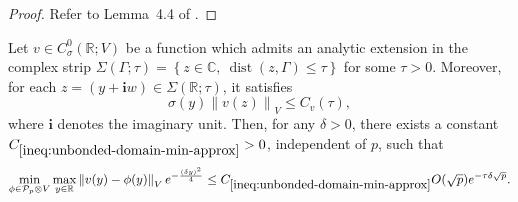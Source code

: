 \documentclass[final,onefignum,onetabnum]{mousaviart}
\begin{document}
			\vspace*{1mm}
			\begin{proof}
				Refer to Lemma~4.4 of \cite{Babuska-Nobile-Tempone}.
			\end{proof}
			
			\vspace*{1mm}
			\begin{lemma}
				\label{lem:unbonded-domain-min-approx}
				Let $v \in C^0_\sigma (\mathbb{R}; V)$ be a function which admits an analytic extension in the complex strip  $\Sigma \left( \Gamma; \tau \right) = \left\lbrace z \in \mathbb{C},~ \operatorname{dist}(z, \Gamma) \leq \tau \right\rbrace $ for some $\tau>0$. Moreover, for each $z = (y + \boldsymbol{i} w) \in \Sigma(\mathbb{R}; \tau)$, it satisfies
				\begin{equation*}
					\sigma(y) \left\| v(z)\right\|_{V} \leq C_v(\tau),
				\end{equation*}
				where $\boldsymbol{i}$ denotes the imaginary unit.
				Then, for any $\delta>0$, there exists a constant $C_{\ref{ineq:unbonded-domain-min-approx}}>0$, independent of $p$, such that
				\begin{equation}
					\label{ineq:unbonded-domain-min-approx}
					\min_{\phi \in \mathcal{P}_p \otimes V} \max_{y \in \mathbb{R}} \left\| v(y) - \phi(y) \right\|_V  e^{-\frac{(\delta y)^2}{4}}
					\leq
					C_{\ref{ineq:unbonded-domain-min-approx}}
					O(\sqrt{p})  e^{-\tau \delta\sqrt{p}}.
				\end{equation}
			\end{lemma}
			
\end{document}
